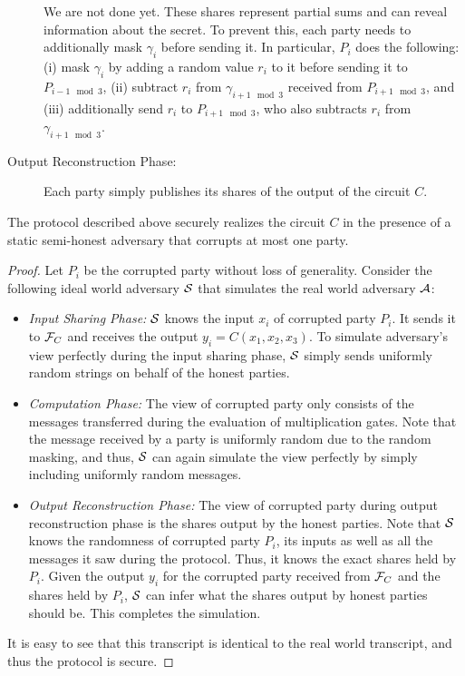 \begin{description}
  We are not done yet. These shares represent partial sums and can reveal information about the secret. To prevent this, each party needs to additionally mask $\gamma_i$ before sending it.
  In particular, $P_i$ does the following: (i) mask $\gamma_i$ by adding a random value $r_i$ to it before sending it to $P_{i-1 \mod 3}$, (ii) subtract $r_i$ from $\gamma_{i+1 \mod 3}$ received from $P_{i+1 \mod 3}$, and (iii) additionally send $r_i$ to $P_{i+1 \mod 3}$, who also subtracts $r_i$ from $\gamma_{i+1 \mod 3}$.

  \item[Output Reconstruction Phase:] 
  Each party simply publishes its shares of the output of the circuit $C$.
\end{description}

\begin{theorem}
  The protocol described above securely realizes the circuit $C$ in the presence of a static semi-honest adversary that corrupts at most one party.
\end{theorem}
\begin{proof}
 Let $P_i$ be the corrupted party without loss of generality. Consider the following ideal world adversary $\mathcal{S}$ that simulates the real world adversary $\mathcal{A}$:
  \begin{itemize}
    \item \emph{Input Sharing Phase:} $\mathcal{S}$ knows the input $x_i$ of corrupted party $P_i$. It sends it to $\mathcal{F}_C$ and receives the output $y_i = C(x_1, x_2, x_3)$. To simulate adversary's view perfectly during the input sharing phase, $\mathcal{S}$ simply sends uniformly random strings on behalf of the honest parties.
    \item \emph{Computation Phase:} The view of corrupted party only consists of the messages transferred during the evaluation of multiplication gates. Note that the message received by a party is uniformly random due to the random masking, and thus, $\mathcal{S}$ can again simulate the view perfectly by simply including uniformly random messages.
    \item \emph{Output Reconstruction Phase:} 
    The view of corrupted party during output reconstruction phase is the shares output by the honest parties. Note that $\mathcal{S}$ knows the randomness of corrupted party $P_i$, its inputs as well as all the messages it saw during the protocol. Thus, it knows the exact shares held by $P_i$. Given the output $y_i$ for the corrupted party received from $\mathcal{F}_C$ and the shares held by $P_i$, $\mathcal{S}$ can infer what the shares output by honest parties should be. This completes the simulation.
  \end{itemize}
  It is easy to see that this transcript is identical to the real world transcript, and thus the protocol is secure.
\end{proof}

